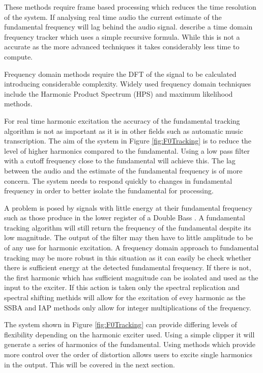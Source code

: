 		These methods require frame based processing which reduces the time resolution of the system. If analysing
		real time audio the current estimate of the fundamental frequency will lag behind the audio signal.
		\citet{larsen2004audio} describe a time domain frequency tracker which uses a simple recursive formula.
		While this is not a accurate as the more advanced techniques it takes considerably less time to compute.

		Frequency domain methods require the DFT of the signal to be calculated introducing considerable
		complexity. Widely used frequency domain techniques include the Harmonic Product Spectrum (HPS) and maximum
		likelihood methods.

		For real time harmonic excitation the accuracy of the fundamental tracking algorithm is not as important as
		it is in other fields such as automatic music transcription. The aim of the system in Figure
		\ref{fig:F0Tracking} is to reduce the level of higher harmonics compared to the fundamental. Using a low
		pass filter with a cutoff frequency close to the fundamental will achieve this. The lag between the audio
		and the estimate of the fundamental frequency is of more concern. The system needs to respond quickly to
		changes in fundamental frequency in order to better isolate the fundamental for processing.

		A problem is posed by signals with little energy at their fundamental frequency such as those produce in
		the lower register of a Double Bass \citep{askenfelt2010double}. A fundamental tracking algorithm will
		still return the frequency of the fundamental despite its low magnitude. The output of the filter may then
		have to little amplitude to be of any use for harmonic excitation. A frequency domain approach to
		fundamental tracking may be more robust in this situation as it can easily be check whether there is
		sufficient energy at the detected fundamental frequency. If there is not, the first harmonic which has
		sufficient magnitude can be isolated and used as the input to the exciter. If this action is taken only the
		spectral replication and spectral shifting methids will allow for the excitation of evey harmonic as the
		SSBA and IAP methods only allow for integer multiplications of the frequency.

		The system shown in Figure \ref{fig:F0Tracking} can provide differing levels of flexibility depending on
		the harmonic exciter used. Using a simple clipper it will generate a series of harmonics of the
		fundamental. Using methods which provide more control over the order of distortion allows users to excite
		single harmonics in the output. This will be covered in the next section.

